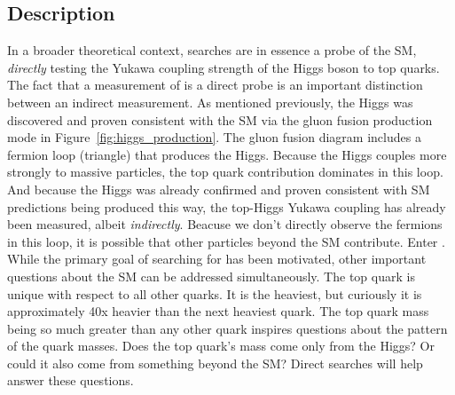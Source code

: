 \subsection{Description}
In a broader theoretical context, \tth searches are in essence a probe of the SM, \emph{directly} testing the Yukawa coupling strength of the Higgs boson to top quarks. The fact that a
measurement of \tth is a direct probe is an important distinction between an indirect measurement. As mentioned previously, the Higgs was discovered and proven
consistent with the SM via the gluon fusion production mode in Figure~\ref{fig:higgs_production}. The gluon fusion diagram includes a fermion loop (triangle)
that produces the Higgs. Because the Higgs couples more strongly to massive particles, the top quark contribution dominates in this loop. And
because the Higgs was already confirmed and proven consistent with SM predictions being produced this way, the top-Higgs Yukawa coupling has already been
measured, albeit \emph{indirectly}. Beacuse we don't directly observe the fermions in this loop, it is possible that other particles beyond the SM contribute.
Enter \tth. While the primary goal of searching for \tth has been motivated,
other important questions about the SM can be addressed simultaneously. The top quark is unique with respect to all other quarks. It is the heaviest, but curiously
it is approximately 40x heavier than the next heaviest quark. The top quark mass
being so much greater than any other quark inspires questions about the pattern of the quark masses. Does the top quark's mass come only from the Higgs? Or could
it also come from something beyond the SM? Direct \tth searches will help answer these questions. 


